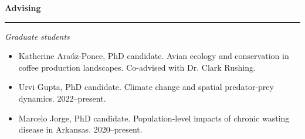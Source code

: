 \documentclass[12pt]{article}
\begin{document}



\vspace{0.5cm}

{\large \bf Advising} \\
\rule[3mm]{\textwidth}{0.3mm}

{\it Graduate students}
\begin{itemize}
  \item Katherine Ara\'uz-Ponce, PhD candidate. Avian ecology and
    conservation in coffee production landscapes. Co-advised with
    Dr. Clark Rushing.
  \item Urvi Gupta, PhD candidate. Climate change and spatial
    predator-prey dynamics. 2022--present. 
  \item Marcelo Jorge, PhD candidate. Population-level impacts of
    chronic wasting disease in Arkansas. 2020--present.
\end{itemize}


\end{document}
